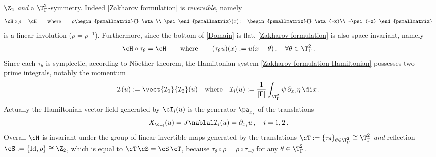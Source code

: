 \documentclass[11pt,a4paper,reqno]{article}
\numberwithin{equation}{section}
\theoremstyle{definition}
\begin{document}
$ \Z_2 $  {\it and} a $ \T^2_\Gamma $-symmetry.  
    Indeed \eqref{Zakharov formulation} is {\it reversible}, namely
\begin{equation}\label{Z2 symmetry}
        \cH \circ 	\rho = \cH 
        \qquad \text{where} \qquad 
        \rho
    \begin{psmallmatrix}{}
            \eta\\
            \psi
        \end{psmallmatrix}
    (x) :=
    \begin{psmallmatrix}{}
            \eta(-x)\\
            -\psi(-x)
        \end{psmallmatrix}  
\end{equation}
is a linear  involution ($ \rho = \rho^{-1} $).
Furthermore, 
since the bottom of \eqref{Domain} is flat, \eqref{Zakharov formulation} is also space invariant, namely
\begin{equation}\label{T2 symmetry}
    \cH \circ \tau_\theta = \cH 
    \qquad \text{where} \qquad 
            (\tau_\theta
            u) (x) :=
          u(x-\theta)  \, , \quad  \forall \theta\in \T^2_\Gamma \, .  
\end{equation} 
Since each   
$ \tau_\theta $ is 
symplectic, 
according to N\"oether theorem, 
the Hamiltonian system \eqref{Zakharov formulation Hamiltonian} 
possesses  
two prime  integrals,  
notably the momentum 
\begin{equation}\label{DefI}
\mathcal{I}(u) :=
\vect{\mathcal{I}_1}{\mathcal{I}_2} (u)  \quad 
    \text{where} \quad \mathcal{I}_i(u):=\frac{1}{|\Gamma|}\int_{ \T^2_\Gamma}\psi\,\partial_{x_i}\eta\, \di x \, . 
\end{equation}
 Actually  the  Hamiltonian vector field
    generated by $\cI_i (u) $ 
    is  
the generator $ \pa_{x_i} $ 
of the translations 
    \begin{equation}\label{XI}
     X_{\cI_i} (u) =J\nablal \mathcal{I}_i (u) =\partial_{x_i} u  \, ,  \quad i=1,2\, . 
    \end{equation}
Overall $ \cH $ is invariant  under the group of linear invertible maps 
generated by the translations 
$ 
\cT := \{ \tau_\theta \}_{\theta \in \T^2_\Gamma} \cong \T^2_\Gamma$ 
{\it and} reflection 
$ \cS := \{ \text{Id}, \rho \}\cong \Z_2 $,
which is 
equal to $ \cT  \,  \cS =  \cS \, \cT $,  because  $ \tau_{\theta} \circ \rho=\rho \circ \tau_{-\theta}$ for any $ \theta \in \T^2_\Gamma $.
\end{document}
